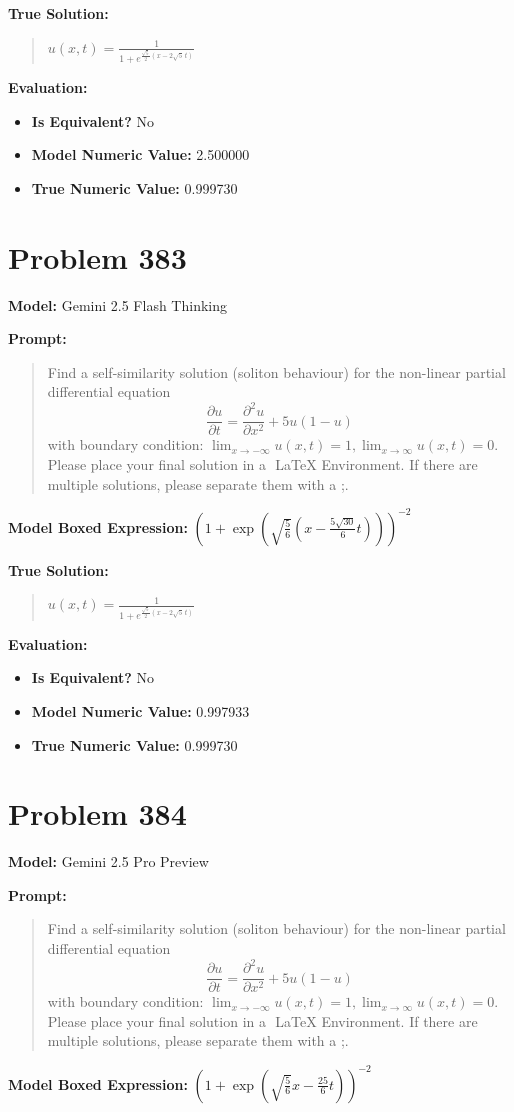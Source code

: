 \documentclass{article}
\begin{document}
{\textbf{True Solution:}
\begin{quote}
$u(x,t) =\frac{1}{1 + e^{\frac{\sqrt{5}}{2}(x - 2\sqrt{5}\, t)}}$
\end{quote}

\textbf{Evaluation:}
\begin{itemize}
\item \textbf{Is Equivalent?} No
\item \textbf{Model Numeric Value:} 2.500000
\item \textbf{True Numeric Value:} 0.999730
\end{itemize}
\vspace{1cm}
\section*{Problem 383}
\textbf{Model:} Gemini 2.5 Flash Thinking

\textbf{Prompt:}
\begin{quote}
Find a self-similarity solution (soliton behaviour) for the non-linear partial differential equation $$\frac{\partial u}{\partial t} = \frac{\partial^2 u}{\partial x^2} + 5u(1-u)$$ with boundary condition: $\lim_{x \to -\infty} u(x,t) = 1,\lim_{x \to \infty} u(x,t) = 0$. Please place your final solution in a $\boxed{}$ LaTeX Environment. If there are multiple solutions, please separate them with a ;.
\end{quote}
\textbf{Model Boxed Expression:} $\left(1+\exp\left(\sqrt{\frac{5}{6}}\left(x - \frac{5\sqrt{30}}{6}t\right)\right)\right)^{-2}$

\textbf{True Solution:}
\begin{quote}
$u(x,t) =\frac{1}{1 + e^{\frac{\sqrt{5}}{2}(x - 2\sqrt{5}\, t)}}$
\end{quote}

\textbf{Evaluation:}
\begin{itemize}
\item \textbf{Is Equivalent?} No
\item \textbf{Model Numeric Value:} 0.997933
\item \textbf{True Numeric Value:} 0.999730
\end{itemize}
\vspace{1cm}
\section*{Problem 384}
\textbf{Model:} Gemini 2.5 Pro Preview

\textbf{Prompt:}
\begin{quote}
Find a self-similarity solution (soliton behaviour) for the non-linear partial differential equation $$\frac{\partial u}{\partial t} = \frac{\partial^2 u}{\partial x^2} + 5u(1-u)$$ with boundary condition: $\lim_{x \to -\infty} u(x,t) = 1,\lim_{x \to \infty} u(x,t) = 0$. Please place your final solution in a $\boxed{}$ LaTeX Environment. If there are multiple solutions, please separate them with a ;.
\end{quote}
\textbf{Model Boxed Expression:} $\left(1+\exp\left(\sqrt{\frac{5}{6}}x-\frac{25}{6}t\right)\right)^{-2}$

}
\end{document}
